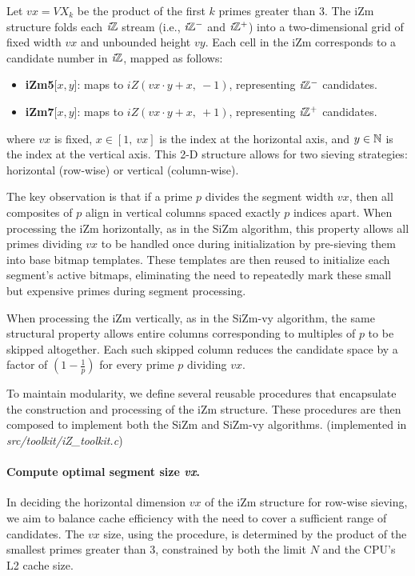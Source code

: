 \documentclass{article}
\begin{document}
Let $vx = VX_k$ be the product of the first $k$ primes greater than 3. 
The iZm structure folds each $\textit{i}\mathbb{Z}$ stream (i.e., $\textit{i}\mathbb{Z}^-$ and $\textit{i}\mathbb{Z}^+$) into a two-dimensional grid of fixed width $vx$ and unbounded height $vy$.
Each cell in the iZm corresponds to a candidate number in $\textit{i}\mathbb{Z}$, mapped as follows:
\begin{itemize}
    \item \textbf{iZm5}[$x, y$]: maps to $iZ(vx\cdot y + x,\ -1)$, representing $\textit{i}\mathbb{Z}^-$ candidates.
    \item \textbf{iZm7}[$x, y$]: maps to $iZ(vx\cdot y + x,\ +1)$, representing $\textit{i}\mathbb{Z}^+$ candidates.
\end{itemize}
where $vx$ is fixed, $x \in [1, \ vx]$ is the index at the horizontal axis, and $y \in \mathbb{N}$ is the index at the vertical axis.
This 2-D structure allows for two sieving strategies: horizontal (row-wise) or vertical (column-wise).

The key observation is that if a prime $p$ divides the segment width $vx$, then all composites of $p$ align in vertical columns spaced exactly $p$ indices apart. When processing the iZm horizontally, as in the SiZm algorithm, this property allows all primes dividing $vx$ to be handled once during initialization by pre-sieving them into base bitmap templates. These templates are then reused to initialize each segment's active bitmaps, eliminating the need to repeatedly mark these small but expensive primes during segment processing.

When processing the iZm vertically, as in the SiZm-vy algorithm, the same structural property allows entire columns corresponding to multiples of $p$ to be skipped altogether. Each such skipped column reduces the candidate space by a factor of $(1 - \tfrac{1}{p})$ for every prime $p$ dividing $vx$.

To maintain modularity, we define several reusable procedures that encapsulate the construction and processing of the iZm structure. These procedures are then composed to implement both the SiZm and SiZm-vy algorithms. (implemented in \emph{src/toolkit/iZ\_toolkit.c})

\paragraph{Compute optimal segment size \emph{vx}.}
In deciding the horizontal dimension $vx$ of the iZm structure for row-wise sieving, we aim to balance cache efficiency with the need to cover a sufficient range of candidates. 
The $vx$ size, using the  procedure, is determined by the product of the smallest primes greater than 3, constrained by both the limit $N$ and the CPU's L2 cache size.
\end{document}
